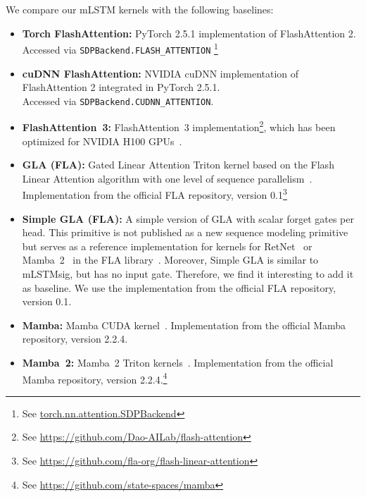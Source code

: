 \documentclass{article}
\begin{document}
    We compare our mLSTM kernels with the following baselines:
    \vspace{-0.2cm}
    \begin{itemize}
        \item \textbf{Torch FlashAttention:} PyTorch 2.5.1 implementation of FlashAttention 2. \\
              Accessed via \texttt{SDPBackend.FLASH\_ATTENTION} \footnote{See \href{https://pytorch.org/docs/stable/generated/torch.nn.attention.SDPBackend.html\#torch.nn.attention.SDPBackend}{torch.nn.attention.SDPBackend}}
        \item \textbf{cuDNN FlashAttention:} NVIDIA cuDNN implementation of FlashAttention 2 integrated in PyTorch 2.5.1. \\
              Accessed via \texttt{SDPBackend.CUDNN\_ATTENTION}.
        \item \textbf{FlashAttention~3:} FlashAttention~3 implementation\footnote{See \url{https://github.com/Dao-AILab/flash-attention}}, which has been optimized for NVIDIA H100 GPUs~\citep{shah:24flashattention3}.
        \item \textbf{GLA (FLA):} Gated Linear Attention Triton kernel based on the Flash Linear Attention algorithm with one level of sequence parallelism~\citep{yang:24gated}.
              Implementation from the official FLA repository, version 0.1\footnote{See \url{https://github.com/fla-org/flash-linear-attention}}
        \item \textbf{Simple GLA (FLA):} A simple version of GLA with scalar forget gates per head.
              This primitive is not published as a new sequence modeling primitive but serves as a reference implementation for kernels for RetNet~\citep{sun:23retentive} or Mamba~2~\citep{dao:24transformersaressms} in the FLA library~\cite{yang:24fla}.
              Moreover, Simple GLA is similar to mLSTMsig, but has no input gate.
              Therefore, we find it interesting to add it as baseline.
              We use the implementation from the official FLA repository, version 0.1.
        \item \textbf{Mamba:} Mamba CUDA kernel~\cite{Gu:24mamba}. Implementation from the official Mamba repository, version 2.2.4.
        \item \textbf{Mamba~2:} Mamba~2 Triton kernels~\cite{dao:24transformersaressms}. Implementation from the official Mamba repository, version 2.2.4.\footnote{See \url{https://github.com/state-spaces/mamba}}
    \end{itemize}
\end{document}
